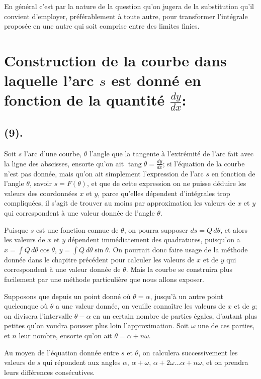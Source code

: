 \documentclass{article}
\begin{document}
En général c'est par la nature de la question qu'on jugera de la substitution qu'il convient d'employer, préférablement à toute autre, pour transformer l'intégrale proposée en une autre qui soit comprise entre des limites finies.

\section*{Construction de la courbe dans laquelle l'arc $s$ est donné en fonction de la quantité $\frac{dy}{dx}$:}

\subsection*{(9).}

Soit $s$ l'arc d'une courbe, $\theta$ l'angle que la tangente à l'extrémité de l'arc fait avec la ligne des abscisses, ensorte qu'on ait $\operatorname{tang}\theta=\frac{dy}{dx}$; si l'équation de la courbe n'est pas donnée, mais qu'on ait simplement l'expression de l'arc $s$ en fonction de l'angle $\theta$, savoir $s=F(\theta)$, et que de cette expression on ne puisse déduire les valeurs des coordonnées $x$ et $y$, parce qu'elles dépendent d'intégrales trop compliquées, il s'agit de trouver au moins par approximation les valeurs de $x$ et $y$ qui correspondent à une valeur donnée de l'angle $\theta$.

Puisque $s$ est une fonction connue de $\theta$, on pourra supposer $ds=Q\,d\theta$, et alors les valeurs de $x$ et $y$ dépendent immédiatement des quadratures, puisqu'on a $x=\displaystyle\int Q\,d\theta\cos\theta$, $y=\displaystyle\int Q\,d\theta\sin\theta$. On pourrait donc faire usage de la méthode donnée dans le chapitre précédent pour calculer les valeurs de $x$ et de $y$ qui correspondent à une valeur donnée de $\theta$. Mais la courbe se construira plus facilement par une méthode particulière que nous allons exposer.

Supposons que depuis un point donné où $\theta=\alpha$, jusqu'à un autre point quelconque où $\theta$ a une valeur donnée, on veuille connaître les valeurs de $x$ et de $y$; on divisera l'intervalle $\theta-\alpha$ en un certain nombre de parties égales, d'autant plus petites qu'on voudra pousser plus loin l'approximation. Soit $\omega$ une de ces parties, et $n$ leur nombre, ensorte qu'on ait $\theta=\alpha+n\omega$.

Au moyen de l'équation donnée entre $s$ et $\theta$, on calculera successivement les valeurs de $s$ qui répondent aux angles $\alpha$, $\alpha+\omega$, $\alpha+2\omega\ldots\alpha+n\omega$, et on prendra leurs différences consécutives.
\end{document}
